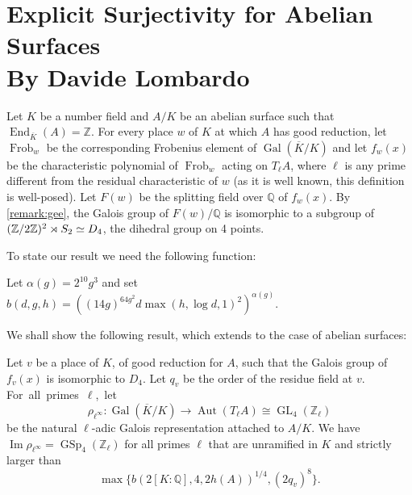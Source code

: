 \section{Explicit Surjectivity for Abelian Surfaces \\ By Davide Lombardo} \label{lombardstreet}

Let $K$ be a number field and $A/K$ be an abelian surface such that $\operatorname{End}_{\overline{K}}(A)=\mathbb{Z}$. For every place $w$ of $K$ at which $A$ has good reduction, let $\operatorname{Frob}_w$ be the corresponding Frobenius element of $\operatorname{Gal}\left( \overline{K}/K\right)$ and let $f_w(x)$ be the characteristic polynomial of $\operatorname{Frob}_w$ acting on $T_\ell A$, where $\ell$ is any prime different from the residual characteristic of $w$ (as it is well known, this definition is well-posed). Let $F(w)$ be the splitting field over $\mathbb{Q}$ of $f_w(x)$. 
By \autoref{remark:gee},
the Galois group of $F(w)/\mathbb{Q}$ is isomorphic to a subgroup of $({\mathbb Z}/2{\mathbb Z})^2 \rtimes S_2 \simeq D_4$, the dihedral group on 4 points.

To state our result we need the following function:
\begin{definition}\label{def:bFunction}
Let $\alpha(g)=2^{10}g^3$ and set
$
b(d,g,h)=\left( (14g)^{64g^2} d \max\left(h, \log d,1 \right)^2 \right)^{\alpha(g)}.
$
\end{definition}

We shall show the following result, which extends \cite[Theorem 1.2]{lombardo2015explicit} to the case of abelian surfaces:
\begin{proposition}\label{prop:Main}
Let $v$ be a place of $K$, of good reduction for $A$, such that the Galois group of $f_v(x)$ is isomorphic to $D_4$. Let $q_v$ be the order of the residue field at $v$. \mbox{For all primes $\ell$, let}
\[
\rho_{\ell^\infty} : \operatorname{Gal}\left( \overline{K}/K \right) \to \operatorname{Aut}(T_\ell A) \cong \operatorname{GL}_4(\mathbb{Z}_\ell)
\]
be the natural $\ell$-adic Galois representation attached to $A/K$. We have $\operatorname{Im} \rho_{\ell^\infty}=\operatorname{GSp}_4(\mathbb{Z}_\ell)$ for all primes $\ell$ that are unramified in $K$ and strictly larger than
\[
\max\{b(2[K:\mathbb{Q}],4,2h(A))^{1/4}, (2q_v)^8 \}.
\]
\end{proposition}


